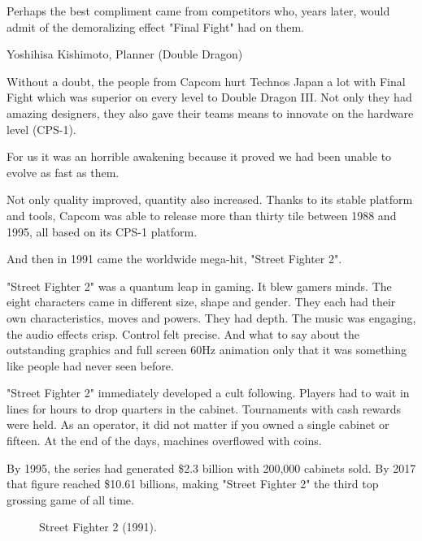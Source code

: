 Perhaps the best compliment came from competitors who, years later, would admit of the demoralizing effect "Final Fight" had on them.

\begin{q}{Yoshihisa Kishimoto, Planner\cite{dd} (Double Dragon)}
  

  Without a doubt, the people from Capcom hurt Technos Japan a lot with Final Fight which was superior on every level to Double Dragon III. Not only they had amazing designers, they also gave their teams means to innovate on the hardware level (CPS-1). 

  For us it was an horrible awakening because it proved we had been unable to evolve as fast as them.
  \end{q}



Not only quality improved, quantity also increased. Thanks to its stable platform and tools, Capcom was able to release more than thirty tile between 1988 and 1995, all based on its CPS-1 platform.

And then in 1991 came the worldwide mega-hit, "Street Fighter 2".

"Street Fighter 2" was a quantum leap in gaming. It blew gamers minds. The eight characters came in different size, shape and gender. They each had their own characteristics, moves and powers. They had depth. The music was engaging, the audio effects crisp. Control felt precise. And what to say about the outstanding graphics and full screen 60Hz animation only that it was something like people had never seen before.


"Street Fighter 2" immediately developed a cult following. Players had to wait in lines for hours to drop quarters in the cabinet. Tournaments with cash rewards were held. As an operator, it did not matter if you owned a single cabinet or fifteen\cite{sf2_oral_history}. At the end of the days, machines overflowed with coins.


By 1995, the series had generated \$2.3 billion with 200,000 cabinets sold\cite{usgamer20160101}. By 2017 that figure reached \$10.61 billions\cite{gamerevolution20140126}, making "Street Fighter 2" the third top grossing game of all time.

\label{nin_sf2}
\begin{figure}[H]
\caption*{Street Fighter 2 (1991).}
\end{figure}


